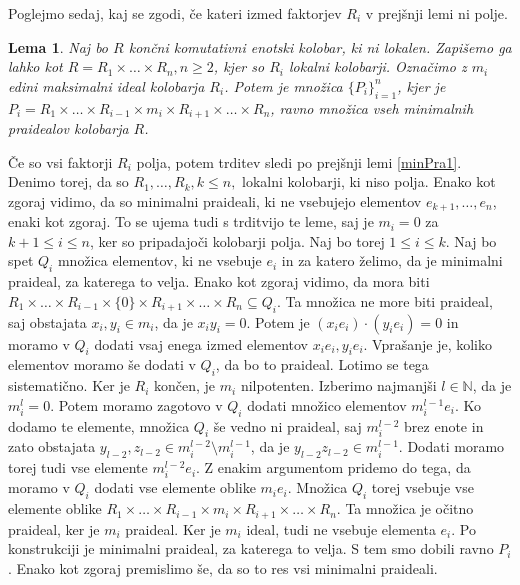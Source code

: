 \documentclass[a4paper, 12pt]{amsart}
\theoremstyle{definition} %
\theoremstyle{plain} %
\newtheorem{lema}[definicija]{Lema}
\newcommand{\N}{\mathbb N}
\begin{document}
Poglejmo sedaj, kaj se zgodi, če kateri izmed faktorjev $R_i$ v prejšnji lemi ni polje.

\begin{lema}
\label{minPra2}
Naj bo $R$ končni komutativni enotski kolobar, ki ni lokalen. Zapišemo ga lahko kot $R = R_1 \times \dots \times R_n, n\ge2$, kjer so $R_i$ lokalni kolobarji. Označimo z $m_i$ edini maksimalni ideal kolobarja $R_i$. Potem je množica $\{P_i\}_{i=1}^n$, kjer je $P_i = R_1 \times \dots \times R_{i-1} \times m_i \times R_{i+1} \times \dots \times R_n$, ravno množica vseh minimalnih praidealov kolobarja $R$.
\end{lema}

\proof
Če so vsi faktorji $R_i$ polja, potem trditev sledi po prejšnji lemi \ref{minPra1}. Denimo torej, da so $R_1, \dots,R_k, k\le n,$ lokalni kolobarji, ki niso polja. Enako kot zgoraj vidimo, da so minimalni praideali, ki ne vsebujejo elementov $e_{k+1}, \dots, e_n$, enaki kot zgoraj. To se ujema tudi s trditvijo te leme, saj je $m_i = 0$ za $k+1 \le i \le n$, ker so pripadajoči kolobarji polja. 
Naj bo torej $1 \le i \le k$. Naj bo spet $Q_i$ množica elementov, ki ne vsebuje $e_i$ in za katero želimo, da je minimalni praideal, za katerega to velja. Enako kot zgoraj vidimo, da mora biti $R_1 \times \dots \times R_{i-1} \times \{0\} \times R_{i+1} \times \dots \times R_n \subseteq Q_i$. Ta množica ne more biti praideal, saj obstajata $x_i,y_i\in m_i$, da je $x_i y_i = 0$. Potem je $(x_i e_i ) \cdot (y_i e_i) = 0$ in moramo v $Q_i$ dodati vsaj enega izmed elementov $x_i e_i, y_i e_i$. Vprašanje je, koliko elementov moramo še dodati v $Q_i$, da bo to praideal. Lotimo se tega sistematično. Ker je $R_i$ končen, je $m_i$ nilpotenten. Izberimo najmanjši $l\in  \N$, da je $m_i^l = 0$. Potem moramo zagotovo v $Q_i$ dodati množico elementov $m_i^{l-1} e_i$. Ko dodamo te elemente, množica $Q_i$ še vedno ni praideal, saj $m_i^{l-2}$ brez enote in zato obstajata $y_{l-2},z_{l-2}\in m_i^{l-2} \setminus m_i^{l-1}$, da je $y_{l-2}z_{l-2} \in m_i^{l-1}$. Dodati moramo torej tudi vse elemente $m_i^{l-2}e_i$. Z enakim argumentom pridemo do tega, da moramo v $Q_i$ dodati vse elemente oblike $m_i e_i$. Množica $Q_i$ torej vsebuje vse elemente oblike $R_1 \times \dots \times R_{i-1} \times m_i \times R_{i+1} \times \dots \times R_n$. Ta množica je očitno praideal, ker je $m_i$ praideal. Ker je $m_i$ ideal, tudi ne vsebuje elementa $e_i$. Po konstrukciji je minimalni praideal, za katerega to velja. S tem smo dobili ravno $P_i$.
Enako kot zgoraj premislimo še, da so to res vsi minimalni praideali.
\endproof
\end{document}
